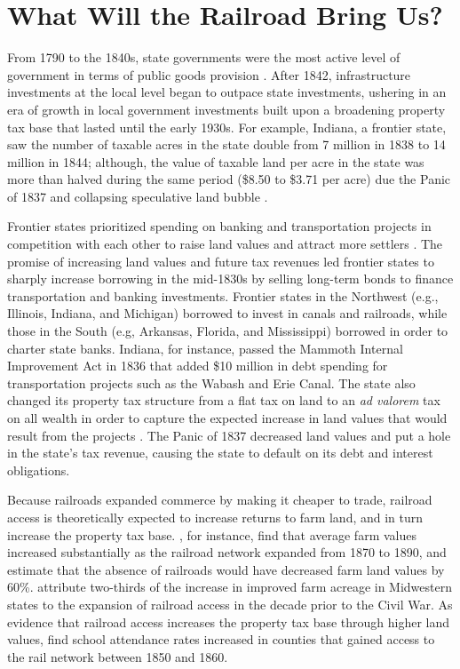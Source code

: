\section{What Will the Railroad Bring Us?} 

From 1790 to the 1840s, state governments were the most active level of government in terms of public goods provision \citep{wallis2000american}. After 1842, infrastructure investments at the local level began to outpace state investments, ushering in an era of growth in local government investments built upon a broadening property tax base that lasted until the early 1930s. For example, Indiana, a frontier state, saw the number of taxable acres in the state double from 7 million in 1838 to 14 million in 1844; although, the value of taxable land per acre in the state was more than halved during the same period (\$8.50 to \$3.71 per acre) due the Panic of 1837 and collapsing speculative land bubble \citep{wallis2004sovereign}. 

Frontier states prioritized spending on banking and transportation projects in competition with each other to raise land values and attract more settlers \citep{sylla1998anatomy}. The promise of increasing land values and future tax revenues led frontier states to sharply increase borrowing in the mid-1830s by selling long-term bonds to finance transportation and banking investments. Frontier states in the Northwest (e.g., Illinois, Indiana, and Michigan) borrowed to invest in canals and railroads, while those in the South (e.g, Arkansas, Florida, and Mississippi) borrowed in order to charter state banks. Indiana, for instance, passed the Mammoth Internal Improvement Act in 1836 that added \$10 million in debt spending for transportation projects such as the Wabash and Erie Canal. The state also changed its property tax structure from a flat tax on land to an \emph{ad valorem} tax on all wealth in order to capture the expected increase in land values that would result from the projects \citep{wallis2004sovereign}. The Panic of 1837 decreased land values and put a hole in the state's tax revenue, causing the state to default on its debt and interest obligations.

Because railroads expanded commerce by making it cheaper to trade, railroad access is theoretically expected to increase returns to farm land, and in turn increase the property tax base. \citet{donaldson2016railroads}, for instance, find that average farm values increased substantially as the railroad network expanded from 1870 to 1890, and estimate that the absence of railroads would have decreased farm land values by 60\%. \citet{atack2011impact} attribute two-thirds of the increase in improved farm acreage in Midwestern states to the expansion of railroad access in the decade prior to the Civil War. As evidence that railroad access increases the property tax base through higher land values, \citet{atack2012impact} find school attendance rates increased in counties that gained access to the rail network between 1850 and 1860. 

